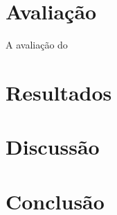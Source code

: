 \documentclass[conference]{IEEEtran}
\begin{document}
\section{Avaliação}
A avaliação do 

\section{Resultados}

\section{Discussão} \label{sec:discussao}

\section{Conclusão}







\end{document}
